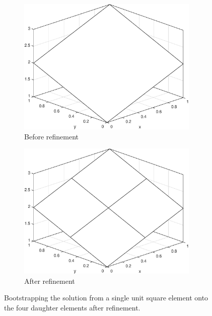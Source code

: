\begin{figure}
\centering
{
	\begin{subfigure}[b]{0.48\textwidth}
		\centering
		\includegraphics[width=0.95\textwidth]{figures/sec_Sn/cell_refinement_before.eps}
		\caption{Before refinement}
		\label{fig::Sn_Solution_Spatial_AMR_BS_before}
	\end{subfigure}
}
	\hfill
{
	\begin{subfigure}[b]{0.48\textwidth}
		\centering
		\includegraphics[width=0.95\textwidth]{figures/sec_Sn/cell_refinement_after.eps}
		\caption{After refinement}
		\label{fig::Sn_Solution_Spatial_AMR_BS_after}
	\end{subfigure}
}
\caption{Bootstrapping the solution from a single unit square element onto the four daughter elements after refinement.}
\label{fig::Sn_Solution_Spatial_AMR_bootstrapping}
\end{figure}

